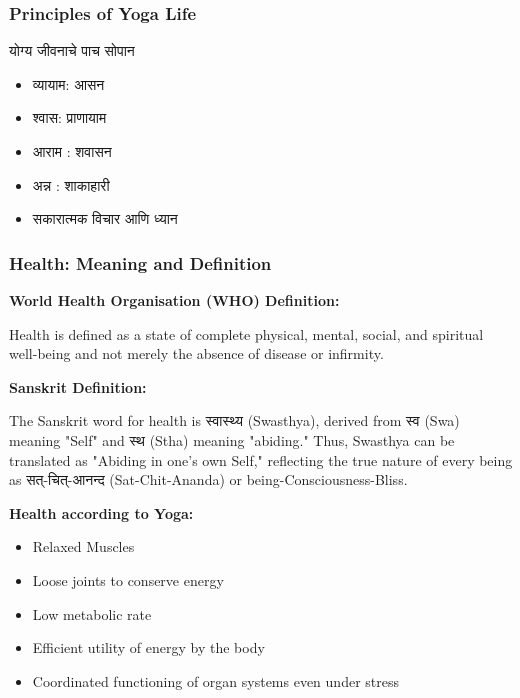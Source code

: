 \begin{frame}[fragile]\frametitle{Principles of Yoga Life}
योग्य जीवनाचे पाच सोपान 
      \begin{itemize}
		\item  व्यायाम: आसन 
		\item  श्वास: प्राणायाम 
		\item  आराम : शवासन 
		\item  अन्न : शाकाहारी 
		\item  सकारात्मक विचार आणि ध्यान 
	  \end{itemize}

\end{frame}
\begin{frame}[fragile]\frametitle{Health: Meaning and Definition}
    \textbf{World Health Organisation (WHO) Definition:}
    
        Health is defined as a state of complete physical, mental, social, and spiritual well-being and not merely the absence of disease or infirmity.
    

    
    \textbf{Sanskrit Definition:} 
    
        The Sanskrit word for health is स्वास्थ्य (Swasthya), derived from स्व (Swa) meaning "Self" and स्थ (Stha) meaning "abiding." Thus, Swasthya can be translated as "Abiding in one's own Self," reflecting the true nature of every being as सत्-चित्-आनन्द (Sat-Chit-Ananda) or being-Consciousness-Bliss.
    

    
    \textbf{Health according to Yoga:}
    \begin{itemize}
        \item Relaxed Muscles
        \item Loose joints to conserve energy
        \item Low metabolic rate
        \item Efficient utility of energy by the body
        \item Coordinated functioning of organ systems even under stress
    \end{itemize}
\end{frame}

